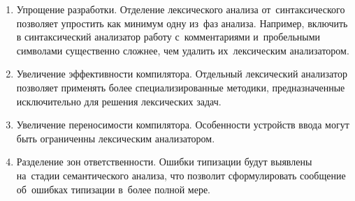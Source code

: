 \begin{enumerate} 
	\item{Упрощение разработки. Отделение лексического анализа от~синтаксического позволяет упростить как минимум одну из~фаз анализа. Например, включить в синтаксический анализатор работу с~комментариями и~пробельными символами существенно сложнее, чем удалить их~лексическим анализатором.}
	\item{Увеличение эффективности компилятора. Отдельный лексический анализатор позволяет применять более специализированные методики, предназначенные исключительно для решения лексических задач.}
	\item{Увеличение переносимости компилятора. Особенности устройств ввода могут быть ограниченны лексическим анализатором.}
	\item{Разделение зон ответственности. Ошибки типизации будут выявлены на~стадии семантического анализа, что позволит сформулировать сообщение об~ошибках типизации в~более полной мере.}
\end{enumerate}
